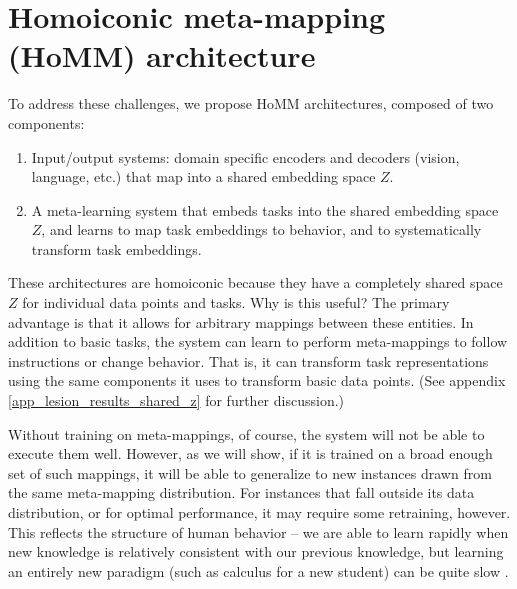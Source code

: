 \documentclass{article}
\begin{document}
\section{Homoiconic meta-mapping (HoMM) architecture}
\vspace{-0.5em} %
To address these challenges, we propose HoMM architectures, composed of two components: 
\vspace{-1em}
\begin{enumerate} \setlength \itemsep{0em}
\item Input/output systems: domain specific encoders and decoders (vision, language, etc.) that map into a shared embedding space $Z$.
\item A meta-learning system that embeds tasks into the shared embedding space $Z$, and learns to map task embeddings to behavior, and to systematically transform task embeddings.
\end{enumerate}
\vspace{-0.75em}
These architectures are homoiconic because they have a completely shared space $Z$ for individual data points and tasks. Why is this useful? The primary advantage is that it allows for arbitrary mappings between these entities. In addition to basic tasks, the system can learn to perform meta-mappings to follow instructions or change behavior. That is, it can transform task representations using the same components it uses to transform basic data points. (See appendix \ref{app_lesion_results_shared_z} for further discussion.) \par
Without training on meta-mappings, of course, the system will not be able to execute them well. However, as we will show, if it is trained on a broad enough set of such mappings, it will be able to generalize to new instances drawn from the same meta-mapping distribution. For instances that fall outside its data distribution, or for optimal performance, it may require some retraining, however. This reflects the structure of human behavior -- we are able to learn rapidly when new knowledge is relatively consistent with our previous knowledge, but learning an entirely new paradigm (such as calculus for a new student) can be quite slow \citep[cf.][]{Kumaran2016, Botvinick2019}. \par 
\end{document}
